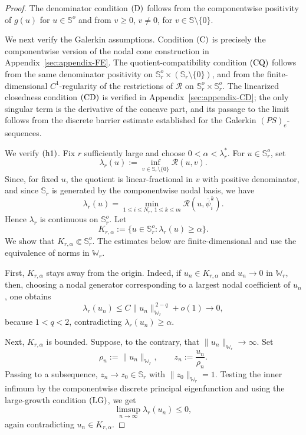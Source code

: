 \documentclass[preprint,10pt]{elsarticle}
\numberwithin{equation}{section}
\begin{document}
\begin{proof}
	The denominator condition \({\rm (D)}\) follows from the componentwise
	positivity of \(g(u)\) for \(u\in\mathbb S^o\) and from
	\(v\ge0\), \(v\ne0\), for \(v\in\mathbb S\setminus\{0\}\).
	
	We next verify the Galerkin assumptions. Condition \({\rm (C)}\) is precisely
	the componentwise version of the nodal cone construction in
	Appendix~\ref{sec:appendix-FE}. The quotient-compatibility condition
	\({\rm (CQ)}\) follows from the same denominator positivity on
	\(\mathbb S_r^o\times(\mathbb S_r\setminus\{0\})\), and from the
	finite-dimensional \(C^1\)-regularity of the restrictions of
	\(\mathcal R\) on \(\mathbb S_r^o\times\mathbb S_r^o\). The linearized
	closedness condition \({\rm (CD)}\) is verified in
	Appendix~\ref{sec:appendix-CD}; the only singular term is the derivative of
	the concave part, and its passage to the limit follows from the discrete
	barrier estimate established for the Galerkin \((PS)_e\)-sequences.
	
	

	
	We verify \({\rm (h1)}\). Fix \(r\) sufficiently large and choose
	\(0<\alpha<\lambda_r^*\). For \(u\in\mathbb S_r^o\), set
	\[
	\lambda_r(u):=
	\inf_{v\in\mathbb S_r\setminus\{0\}}\mathcal R(u,v).
	\]
	Since, for fixed \(u\), the quotient is linear-fractional in \(v\) with
	positive denominator, and since \(\mathbb S_r\) is generated by the
	componentwise nodal basis, we have
	\[
	\lambda_r(u)
	=
	\min_{1\le i\le N_r,\ 1\le k\le m}
	\mathcal R(u,\bar\psi_i^k).
	\]
	Hence \(\lambda_r\) is continuous on \(\mathbb S_r^o\). Let
	\[
	K_{r,\alpha}:=
	\{u\in\mathbb S_r^o:\lambda_r(u)\ge\alpha\}.
	\]
	We show that \(K_{r,\alpha}\Subset\mathbb S_r^o\). The estimates below are
	finite-dimensional and use the equivalence of norms in \(\mathbb W_r\).
	
	First, \(K_{r,\alpha}\) stays away from the origin. Indeed, if
	\(u_n\in K_{r,\alpha}\) and \(u_n\to0\) in \(\mathbb W_r\), then, choosing a
	nodal generator corresponding to a largest nodal coefficient of \(u_n\),
	one obtains
	\[
	\lambda_r(u_n)\le C\|u_n\|_{\mathbb W_r}^{\,2-q}+o(1)\to0,
	\]
	because \(1<q<2\), contradicting \(\lambda_r(u_n)\ge\alpha\).
	
	Next, \(K_{r,\alpha}\) is bounded. Suppose, to the contrary, that
	\(\|u_n\|_{\mathbb W_r}\to\infty\). Set
	\[
	\rho_n:=\|u_n\|_{\mathbb W_r},
	\qquad
	z_n:=\frac{u_n}{\rho_n}.
	\]
	Passing to a subsequence, \(z_n\to z_0\in\mathbb S_r\) with
	\(\|z_0\|_{\mathbb W_r}=1\). Testing the inner infimum by the
	componentwise discrete principal eigenfunction and using the large-growth
	condition \({\rm (LG)}\), we get
	\[
	\limsup_{n\to\infty}\lambda_r(u_n)\le0,
	\]
	again contradicting \(u_n\in K_{r,\alpha}\).
	

\end{proof}
\end{document}
